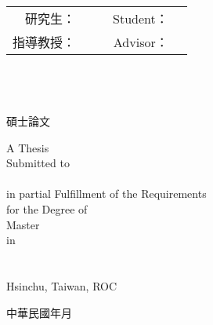 \begin{center}
	\LARGE \titleCh\\[1.5cm]
	\LARGE \titleEn\\[1.5cm]

	\Large
	\begin{tabular}{r l c r l}
	研究生： & \studentCh & \hspace{3cm} & Student： & \studentEn \\
	指導教授： & \advisorCh & \hspace{3cm} & Advisor： & \advisorEn \\
	\end{tabular}
	\\[1.5cm]
	\universityCh \\
	\instituteCh \\
	碩士論文 \\[1cm]

	\large
	\begin{singlespace}
	A Thesis \\
	Submitted to \instituteEn \\
	\universityEn \\
	in partial Fulfillment of the Requirements\\
	for the Degree of \\
	Master\\
	in\\[1cm]
	\collegeEn \\[1cm]
	  \\
	Hsinchu, Taiwan, ROC \\
	\end{singlespace}

	{\Large 中華民國 年 月}
\end{center}



